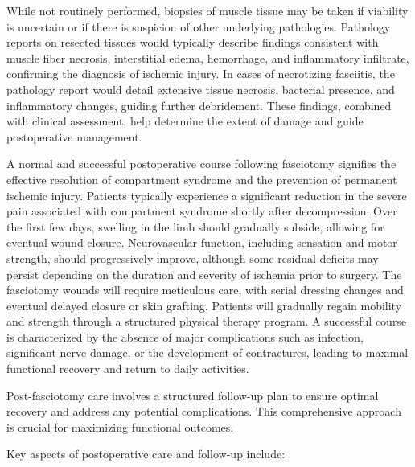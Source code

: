 While not routinely performed, biopsies of muscle tissue may be taken if viability is uncertain or if there is suspicion of other underlying pathologies. Pathology reports on resected tissues would typically describe findings consistent with muscle fiber necrosis, interstitial edema, hemorrhage, and inflammatory infiltrate, confirming the diagnosis of ischemic injury. In cases of necrotizing fasciitis, the pathology report would detail extensive tissue necrosis, bacterial presence, and inflammatory changes, guiding further debridement. These findings, combined with clinical assessment, help determine the extent of damage and guide postoperative management.

A normal and successful postoperative course following fasciotomy signifies the effective resolution of compartment syndrome and the prevention of permanent ischemic injury. Patients typically experience a significant reduction in the severe pain associated with compartment syndrome shortly after decompression. Over the first few days, swelling in the limb should gradually subside, allowing for eventual wound closure. Neurovascular function, including sensation and motor strength, should progressively improve, although some residual deficits may persist depending on the duration and severity of ischemia prior to surgery. The fasciotomy wounds will require meticulous care, with serial dressing changes and eventual delayed closure or skin grafting. Patients will gradually regain mobility and strength through a structured physical therapy program. A successful course is characterized by the absence of major complications such as infection, significant nerve damage, or the development of contractures, leading to maximal functional recovery and return to daily activities.

Post-fasciotomy care involves a structured follow-up plan to ensure optimal recovery and address any potential complications. This comprehensive approach is crucial for maximizing functional outcomes.

Key aspects of postoperative care and follow-up include:

